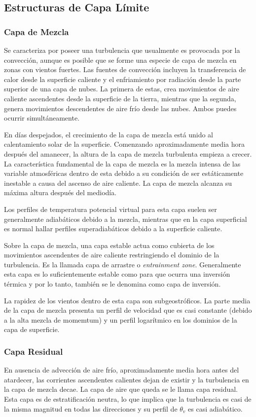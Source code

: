 \subsection{Estructuras de Capa Límite}
\subsubsection{Capa de Mezcla}
Se caracteriza por poseer una turbulencia que usualmente es provocada por la convección, aunque es posible que se forme una especie de capa de mezcla en zonas con vientos fuertes. Las fuentes de convección incluyen la transferencia de calor desde la superficie caliente y el enfriamiento por radiación desde la parte superior de una capa de nubes. La primera de estas, crea movimientos de aire caliente ascendentes desde la superficie de la tierra, mientras que la segunda, genera movimientos descendentes de aire frío desde las nubes. Ambos puedes ocurrir simultáneamente.

En días despejados, el crecimiento de la capa de mezcla está unido al calentamiento solar de la superficie. Comenzando aproximadamente media hora después del amanecer, la altura de la capa de mezcla turbulenta empieza a crecer. La característica fundamental de la capa de mezcla es la mezcla intensa de las variable atmosféricas dentro de esta debido a su condición de ser estáticamente inestable a causa del ascenso de aire caliente. La capa de mezcla alcanza su máxima altura después del mediodía.

Los perfiles de temperatura potencial virtual para esta capa suelen ser generalmente adiabáticos debido a la mezcla, mientras que en la capa superficial es normal hallar perfiles superadiabáticos debido a la superficie caliente.

Sobre la capa de mezcla, una capa estable actua como cubierta de los movimientos ascendentes de aire caliente restringiendo el dominio de la turbulencia. Es la llamada capa de arrastre o \emph{entrainment zone}. Generalmente esta capa es lo suficientemente estable como para que ocurra una inversión térmica y por lo tanto, también se le denomina como capa de inversión.

La rapidez de los vientos dentro de esta capa son subgeostróficos. La parte media de la capa de mezcla presenta un perfil de velocidad que es casi constante (debido a la alta mezcla de momemtum) y un perfil logarítmico en los dominios de la capa de superficie.

\subsubsection{Capa Residual}
En ausencia de advección de aire frío, aproximadamente media hora antes del atardecer, las corrientes ascendentes calientes dejan de existir y la turbulencia en la capa de mezcla decae. La capa de aire que queda se le llama capa residual. Esta capa es de estratificación neutra, lo que implica que la turbulencia es casi de la misma magnitud en todas las direcciones y su perfil de $\theta_v$ es casi adiabático.

